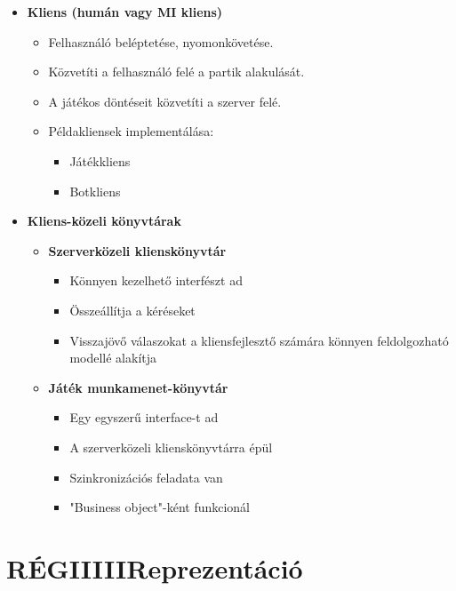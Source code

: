 \documentclass[twoside, a4paper, 12pt]{book}
\begin{document}
\begin{itemize}
\begin{itemize}
		\item \textbf{Kliens (humán vagy MI kliens)}
		\begin{itemize}
			\item Felhasználó beléptetése, nyomonkövetése.
			\item Közvetíti a felhasználó felé a partik alakulását.
			\item A játékos döntéseit közvetíti a szerver felé.
			\item Példakliensek implementálása:
			\begin{itemize}
				\item Játékkliens
				\item Botkliens
			\end{itemize}
		\end{itemize}
	\item \textbf{Kliens-közeli könyvtárak}
	\begin{itemize}
		\item \textbf{Szerverközeli klienskönyvtár}
		\begin{itemize}
			\item Könnyen kezelhető interfészt ad
			\item Összeállítja a kéréseket
			\item Visszajövő válaszokat a kliensfejlesztő számára könnyen feldolgozható modellé alakítja
		\end{itemize}
		\item \textbf{Játék munkamenet-könyvtár}
		\begin{itemize}
			\item Egy egyszerű interface-t ad
			\item A szerverközeli klienskönyvtárra épül
			\item Szinkronizációs feladata van
			\item "Business object"-ként funkcionál
		\end{itemize}
	\end{itemize}
	\end{itemize}
\end{itemize}











\section{RÉGIIIIIReprezentáció}
\end{document}
